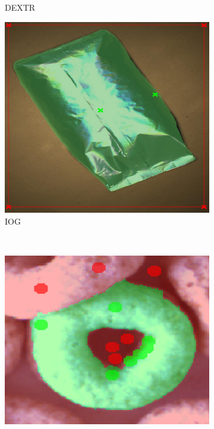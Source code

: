 \begin{figure}
\begin{subfigure}[t]{0.3\textwidth}
		\caption{DEXTR}
	\end{subfigure}
	\hfill
	\begin{subfigure}[t]{0.3\textwidth}
		\centering
		\includegraphics[width=\textwidth]{figures/appendix/method_predictions/bag21_iog.png}
		\caption{IOG}
	\end{subfigure}
	\\
	\begin{subfigure}[t]{0.3\textwidth}
		\centering
		\includegraphics[width=\textwidth]{figures/appendix/method_predictions/cereal67_watershed.png}

\end{subfigure}
\end{figure}
